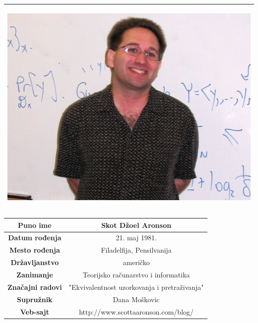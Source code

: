\documentclass[a4paper]{article}
\begin{document}
{\begin{table}[h!]
\begin{center}
\begin{tabular}{|p{10.1cm}|}
\begin{center}
\includegraphics[scale=0.4]{Scott Aaronson.jpg}
\end{center}
\\ \hline

\end{tabular}

\hspace*{0.1cm}\begin{tabular}{|c|c|}
\textbf{Puno ime} & Skot Džoel Aronson\\ \hline
\textbf{Datum rođenja} & 21. maj 1981. \\ \hline
\textbf{Mesto rođenja} & Filadelfija, Pensilvanija\\ \hline
\textbf{Državljanstvo} & američko\\ \hline
\textbf{Zanimanje} & Teorijsko računarstvo i informatika\\ \hline
\textbf{Značajni radovi}  & "Ekvivalentnost uzorkovanja i pretraživanja"\\ \hline
\textbf{Supružnik} & Dana Moškovic\\ \hline
\textbf{Veb-sajt} & http://www.scottaaronson.com/blog/ \\ \hline

\end{tabular}
\label{tab:Slika1}

\end{center}
\end{table}

\newpage
}
\end{document}
